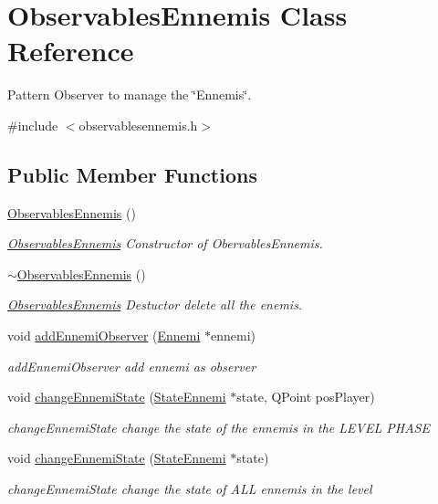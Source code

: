 \hypertarget{class_observables_ennemis}{}\section{Observables\+Ennemis Class Reference}
\label{class_observables_ennemis}


Pattern Observer to manage the \char`\"{}\+Ennemis\char`\"{}.  




{\ttfamily \#include $<$observablesennemis.\+h$>$}

\subsection*{Public Member Functions}
\begin{DoxyCompactItemize}
\item 
\hyperlink{class_observables_ennemis_a42dd715d39ad5f9bd012d7528e9c2dcd}{Observables\+Ennemis} ()
\begin{DoxyCompactList}\small\item\em \hyperlink{class_observables_ennemis}{Observables\+Ennemis} Constructor of Obervables\+Ennemis. \end{DoxyCompactList}\item 
\hypertarget{class_observables_ennemis_a37d10132996864424b4ed7d42a001fdd}{}\hyperlink{class_observables_ennemis_a37d10132996864424b4ed7d42a001fdd}{$\sim$\+Observables\+Ennemis} ()\label{class_observables_ennemis_a37d10132996864424b4ed7d42a001fdd}

\begin{DoxyCompactList}\small\item\em \hyperlink{class_observables_ennemis}{Observables\+Ennemis} Destuctor delete all the enemis. \end{DoxyCompactList}\item 
void \hyperlink{class_observables_ennemis_a48eb828afb8e50cf69fc8b2f91ed0434}{add\+Ennemi\+Observer} (\hyperlink{class_ennemi}{Ennemi} $\ast$ennemi)
\begin{DoxyCompactList}\small\item\em add\+Ennemi\+Observer add ennemi as observer \end{DoxyCompactList}\item 
void \hyperlink{class_observables_ennemis_ab3acc25c7954854360abf2d92bd27b48}{change\+Ennemi\+State} (\hyperlink{class_state_ennemi}{State\+Ennemi} $\ast$state, Q\+Point pos\+Player)
\begin{DoxyCompactList}\small\item\em change\+Ennemi\+State change the state of the ennemis in the L\+E\+V\+E\+L P\+H\+A\+S\+E \end{DoxyCompactList}\item 
void \hyperlink{class_observables_ennemis_a7919a80b578c68c50b98a4c3f4d7e3c5}{change\+Ennemi\+State} (\hyperlink{class_state_ennemi}{State\+Ennemi} $\ast$state)
\begin{DoxyCompactList}\small\item\em change\+Ennemi\+State change the state of A\+L\+L ennemis in the level \end{DoxyCompactList}\end{DoxyCompactItemize}



